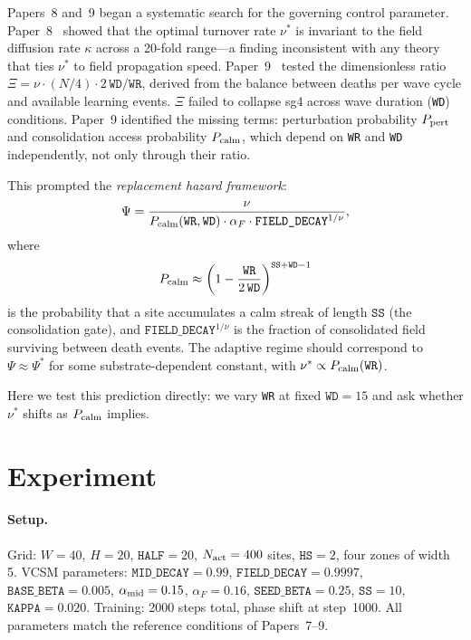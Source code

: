 \documentclass[11pt]{article}
\begin{document}
Papers~8 and~9 began a systematic search for the governing control parameter.
Paper~8~\cite{paper8} showed that the optimal turnover rate $\nu^*$ is invariant to
the field diffusion rate $\kappa$ across a 20-fold range---a finding inconsistent
with any theory that ties $\nu^*$ to field propagation speed.
Paper~9~\cite{paper9} tested the dimensionless ratio
$\Xi = \nu \cdot (N/4) \cdot 2\,\texttt{WD}/\texttt{WR}$,
derived from the balance between deaths per wave cycle and available learning
events.
$\Xi$ failed to collapse sg4 across wave duration (\texttt{WD}) conditions.
Paper~9 identified the missing terms: perturbation probability $P_{\rm pert}$
and consolidation access probability $P_{\rm calm}$, which depend on \texttt{WR}
and \texttt{WD} independently, not only through their ratio.

This prompted the \emph{replacement hazard framework}:
\begin{equation}
  \Psi = \frac{\nu}{P_{\rm calm}(\texttt{WR},\texttt{WD})
               \cdot \alpha_F
               \cdot \texttt{FIELD\_DECAY}^{1/\nu}},
  \label{eq:psi}
\end{equation}
where
\begin{equation}
  P_{\rm calm} \approx \left(1 - \frac{\texttt{WR}}{2\,\texttt{WD}}\right)^{\texttt{SS}+\texttt{WD}-1}
  \label{eq:pcalm}
\end{equation}
is the probability that a site accumulates a calm streak of length
$\texttt{SS}$ (the consolidation gate), and $\texttt{FIELD\_DECAY}^{1/\nu}$
is the fraction of consolidated field surviving between death events.
The adaptive regime should correspond to $\Psi \approx \Psi^*$ for some
substrate-dependent constant, with $\nu^* \propto P_{\rm calm}(\texttt{WR})$.

Here we test this prediction directly: we vary \texttt{WR} at fixed
$\texttt{WD}=15$ and ask whether $\nu^*$ shifts as $P_{\rm calm}$ implies.

\section{Experiment}

\paragraph{Setup.}
Grid: $W=40$, $H=20$, $\texttt{HALF}=20$, $N_{\rm act}=400$ sites,
$\texttt{HS}=2$, four zones of width 5.
VCSM parameters: $\texttt{MID\_DECAY}=0.99$, $\texttt{FIELD\_DECAY}=0.9997$,
$\texttt{BASE\_BETA}=0.005$, $\alpha_{\rm mid}=0.15$, $\alpha_F=0.16$,
$\texttt{SEED\_BETA}=0.25$, $\texttt{SS}=10$, $\texttt{KAPPA}=0.020$.
Training: 2000 steps total, phase shift at step~1000.
All parameters match the reference conditions of Papers~7--9.
\end{document}
